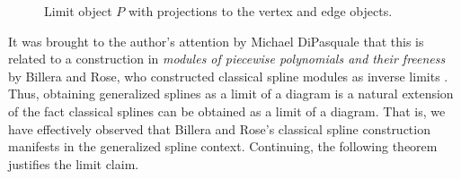 \documentclass{article}
\begin{document}
\begin{figure}
\centering
{}
\caption{Limit object $P$ with projections to the vertex and edge objects.}
\label{fig:triangle-limit}
\end{figure}

It was brought to the author's attention by Michael DiPasquale that this is related to a construction in \textit{modules of piecewise polynomials and their freeness} by Billera and Rose, who constructed classical spline modules as inverse limits \cite{billera1992modules}. Thus, obtaining generalized splines as a limit of a diagram is a natural extension of the fact classical splines can be obtained as a limit of a diagram. That is, we have effectively observed that Billera and Rose's classical spline construction manifests in the generalized spline context. Continuing, the following theorem justifies the limit claim.
\end{document}
